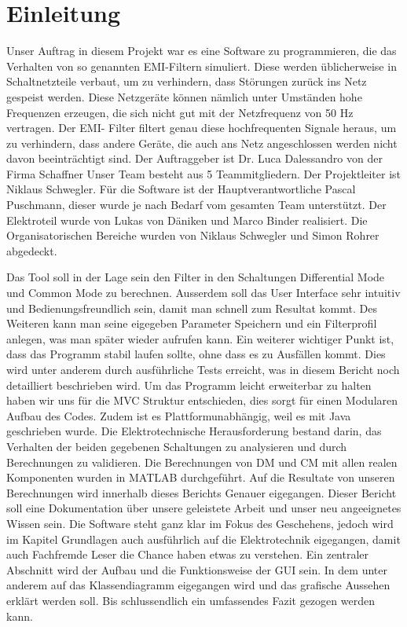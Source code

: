 \section{Einleitung} \label{sec:einleitung}
Unser Auftrag in diesem Projekt war es eine Software zu programmieren, die das Verhalten von so genannten EMI-Filtern simuliert. Diese werden üblicherweise in Schaltnetzteile verbaut, um zu verhindern, dass Störungen zurück ins Netz gespeist werden. Diese Netzgeräte können nämlich unter Umständen hohe Frequenzen erzeugen, die sich nicht gut mit der Netzfrequenz von 50 Hz vertragen. Der EMI- Filter filtert genau diese hochfrequenten Signale heraus, um zu verhindern, dass andere  Geräte, die auch ans Netz angeschlossen werden nicht davon beeinträchtigt sind.
Der Auftraggeber ist Dr. Luca Dalessandro von der Firma Schaffner 
Unser Team besteht aus 5 Teammitgliedern. Der Projektleiter ist Niklaus Schwegler. Für die Software ist der Hauptverantwortliche Pascal Puschmann, dieser wurde je nach Bedarf vom gesamten Team unterstützt. Der Elektroteil wurde von Lukas von Däniken und Marco Binder realisiert. Die Organisatorischen Bereiche wurden von Niklaus Schwegler und Simon Rohrer abgedeckt.

Das Tool soll in der Lage sein den Filter in den Schaltungen Differential Mode und Common Mode zu berechnen. Ausserdem soll das User Interface sehr intuitiv und Bedienungsfreundlich sein, damit man schnell zum Resultat kommt. Des Weiteren kann man seine eigegeben Parameter Speichern und ein Filterprofil anlegen, was man später wieder aufrufen kann. Ein weiterer wichtiger Punkt ist, dass das Programm stabil laufen sollte, ohne dass es zu Ausfällen kommt. Dies wird unter anderem durch ausführliche Tests erreicht, was in diesem Bericht noch detailliert beschrieben wird. 
Um das Programm leicht erweiterbar zu halten haben wir uns für die MVC Struktur entschieden, dies sorgt für einen Modularen Aufbau des Codes. Zudem ist es Plattformunabhängig, weil es mit Java geschrieben wurde.
Die Elektrotechnische Herausforderung bestand darin, das Verhalten der beiden gegebenen Schaltungen zu analysieren und durch Berechnungen zu validieren. 
Die Berechnungen von DM und CM mit allen realen Komponenten wurden in MATLAB durchgeführt.
Auf die Resultate von unseren Berechnungen wird innerhalb dieses Berichts Genauer eigegangen.  
Dieser Bericht soll eine Dokumentation über unsere geleistete Arbeit und unser neu angeeignetes Wissen sein. 
Die Software steht ganz klar im Fokus des Geschehens, jedoch wird im Kapitel Grundlagen auch ausführlich auf die Elektrotechnik eigegangen, damit auch Fachfremde Leser die Chance haben etwas zu verstehen. 
Ein zentraler Abschnitt wird der Aufbau und die Funktionsweise der GUI sein. In dem unter anderem auf das Klassendiagramm eigegangen wird und das grafische Aussehen erklärt werden soll. 
Bis schlussendlich ein umfassendes Fazit gezogen werden kann. 
